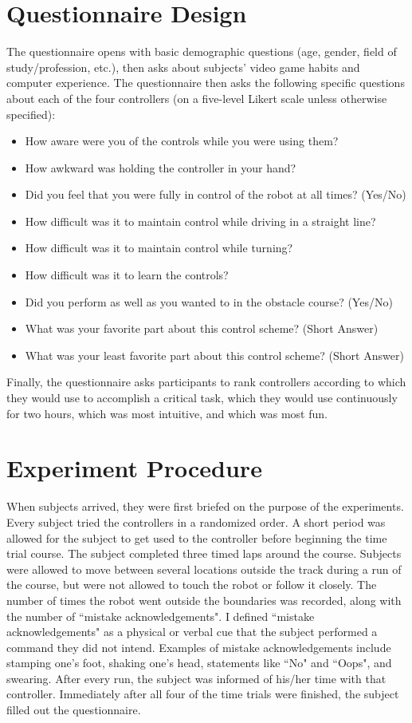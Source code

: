 \documentclass[12pt,a4paper]{report}
\begin{document}
\section{Questionnaire Design}
The questionnaire opens with basic demographic questions (age, gender, field of study/profession, etc.), then   asks about subjects' video game habits and computer experience. The questionnaire then asks the following specific questions about each of the four controllers (on a five-level Likert scale unless otherwise specified):
\begin{itemize}
\item How aware were you of the controls while you were using them?
\item How awkward was holding the controller in your hand?
\item Did you feel that you were fully in control of the robot at all times? (Yes/No)
\item How difficult was it to maintain control while driving in a straight line? 
\item How difficult was it to maintain control while turning?
\item How difficult was it to learn the controls?
\item Did you perform as well as you wanted to in the obstacle course? (Yes/No)
\item What was your favorite part about this control scheme? (Short Answer)
\item What was your least favorite part about this control scheme? (Short Answer)
\end{itemize} 
Finally, the questionnaire asks participants to rank controllers according to which they would use to accomplish a critical task, which they would use continuously for two hours, which was most intuitive, and which was most fun.

\section{Experiment Procedure}
When subjects arrived, they were first briefed on the purpose of the experiments. Every subject tried the controllers in a randomized order. A short period was allowed for the subject to get used to the controller before beginning the time trial course. The subject completed three timed laps around the course. Subjects were allowed to move between several locations outside the track during a run of the course, but were not allowed to touch the robot or follow it closely. The number of times the robot went outside the boundaries was recorded, along with the number of ``mistake acknowledgements". I defined ``mistake acknowledgements" as a physical or verbal cue that the subject performed a command they did not intend. Examples of mistake acknowledgements include stamping one's foot, shaking one's head, statements like ``No" and ``Oops", and swearing. After every run, the subject was informed of his/her time with that controller. Immediately after all four of the time trials were finished, the subject filled out the questionnaire. 
\end{document}
